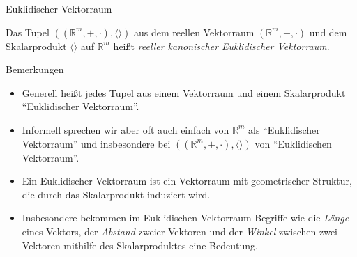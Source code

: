 \documentclass[
  8pt,
  ignorenonframetext,
]{beamer}
\providecommand{\tightlist}{%
  \setlength{\itemsep}{0pt}\setlength{\parskip}{0pt}}
\begin{document}
\begin{frame}{Euklidischer Vektorraum}
\protect\hypertarget{euklidischer-vektorraum-2}{}
\small
\begin{definition}
\justifying
Das Tupel $\left((\mathbb{R}^m, +, \cdot), \langle \rangle \right)$ aus dem reellen Vektorraum $(\mathbb{R}^m, +, \cdot)$ und dem Skalarprodukt $\langle \rangle$ auf
$\mathbb{R}^m$ heißt \textit{reeller kanonischer Euklidischer Vektorraum}.
\end{definition}

Bemerkungen

\footnotesize

\begin{itemize}
\tightlist
\item
  \justifying Generell heißt jedes Tupel aus einem Vektorraum und einem
  Skalarprodukt ``Euklidischer Vektorraum''.
\item
  Informell sprechen wir aber oft auch einfach von \(\mathbb{R}^m\) als
  ``Euklidischer Vektorraum'' und insbesondere bei
  \(\left((\mathbb{R}^m, +, \cdot), \langle \rangle \right)\) von
  ``Euklidischen Vektorraum''.
\item
  Ein Euklidischer Vektorraum ist ein Vektorraum mit geometrischer
  Struktur, die durch das Skalarprodukt induziert wird.
\item
  Insbesondere bekommen im Euklidischen Vektorraum Begriffe wie die
  \emph{Länge} eines Vektors, der \emph{Abstand} zweier Vektoren und der
  \emph{Winkel} zwischen zwei Vektoren mithilfe des Skalarproduktes eine
  Bedeutung.
\end{itemize}
\end{frame}
\end{document}

